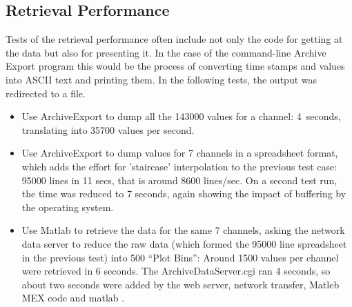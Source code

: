 \subsection{Retrieval Performance}
Tests of the retrieval performance often include not only the
code for getting at the data but also for presenting it. In the
case of the command-line Archive Export program this would be the process
of converting time stamps and values into ASCII text and printing them.
In the following tests, the output was redirected to a file.
\begin{itemize}
\item Use ArchiveExport to dump all the 143000 values for a channel:
      4~seconds, translating into 35700 values per second.
\item Use ArchiveExport to dump values for 7 channels in a spreadsheet format,
      which adds the effort for 'staircase' interpolation to the
      previous test case:
      95000 lines in 11 secs, that is around 8600 lines/sec.
      On a second test run, the time was reduced to 7 seconds, again
      showing the impact of buffering by the operating system.
\item Use Matlab to retrieve the data for the same 7 channels,
      asking the network data server to reduce the raw data (which
      formed the 95000 line spreadsheet in the previous test) into
      500 ``Plot Bins'':
      Around 1500 values per channel were retrieved in 6 seconds.
      The ArchiveDataServer.cgi ran 4 seconds, so about two
      seconds were added by the web server, network transfer, Matleb
      MEX code and matlab .
\end{itemize}

